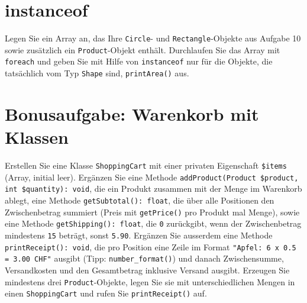 \documentclass[a4paper,12pt]{article}
\begin{document}
\section{instanceof}

Legen Sie ein Array an, das Ihre \texttt{Circle}- und \texttt{Rectangle}-Objekte aus Aufgabe 10 sowie zusätzlich ein \texttt{Product}-Objekt enthält. Durchlaufen Sie das Array mit \texttt{foreach} und geben Sie mit Hilfe von \texttt{instanceof} nur für die Objekte, die tatsächlich vom Typ \texttt{Shape} sind, \texttt{printArea()} aus.

\section{Bonusaufgabe: Warenkorb mit Klassen}

Erstellen Sie eine Klasse \texttt{ShoppingCart} mit einer privaten Eigenschaft \texttt{\$items} (Array, initial leer). Ergänzen Sie eine Methode \texttt{addProduct(Product \$product, int \$quantity): void}, die ein Produkt zusammen mit der Menge im Warenkorb ablegt, eine Methode \texttt{getSubtotal(): float}, die über alle Positionen den Zwischenbetrag summiert (Preis mit \texttt{getPrice()} pro Produkt mal Menge), sowie eine Methode \texttt{getShipping(): float}, die \texttt{0} zurückgibt, wenn der Zwischenbetrag mindestens \texttt{15} beträgt, sonst \texttt{5.90}. Ergänzen Sie ausserdem eine Methode \texttt{printReceipt(): void}, die pro Position eine Zeile im Format \texttt{"{}Apfel: 6 x 0.5 = 3.00 CHF"} ausgibt (Tipp: \texttt{number\_format()}) und danach Zwischensumme, Versandkosten und den Gesamtbetrag inklusive Versand ausgibt. Erzeugen Sie mindestens drei \texttt{Product}-Objekte, legen Sie sie mit unterschiedlichen Mengen in einen \texttt{ShoppingCart} und rufen Sie \texttt{printReceipt()} auf.
\end{document}
